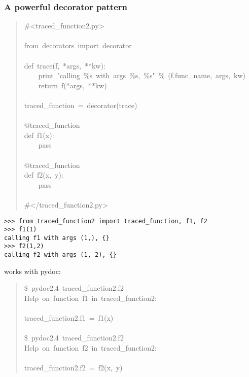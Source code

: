 \documentclass[10pt,a4paper,english]{article}
\begin{document}
\subsubsection*{A powerful decorator pattern}
\begin{quote}{\ttfamily \raggedright \noindent
{\#}<traced{\_}function2.py>~\\
~\\
from~decorators~import~decorator~\\
~\\
def~trace(f,~*args,~**kw):~\\
~~~~print~"calling~{\%}s~with~args~{\%}s,~{\%}s"~{\%}~(f.func{\_}name,~args,~kw)~~\\
~~~~return~f(*args,~**kw)~\\
~\\
traced{\_}function~=~decorator(trace)~\\
~\\
@traced{\_}function~\\
def~f1(x):~\\
~~~~pass~\\
~\\
@traced{\_}function~\\
def~f2(x,~y):~\\
~~~~pass~\\
~\\
{\#}</traced{\_}function2.py>
}\end{quote}
\begin{verbatim}>>> from traced_function2 import traced_function, f1, f2
>>> f1(1)
calling f1 with args (1,), {}
>>> f2(1,2)
calling f2 with args (1, 2), {}\end{verbatim}

works with pydoc:
\begin{quote}{\ttfamily \raggedright \noindent
{\$}~pydoc2.4~traced{\_}function2.f2~~~\\
Help~on~function~f1~in~traced{\_}function2:~\\
~\\
traced{\_}function2.f1~=~f1(x)~\\
~\\
{\$}~pydoc2.4~traced{\_}function2.f2~~~\\
Help~on~function~f2~in~traced{\_}function2:~\\
~\\
traced{\_}function2.f2~=~f2(x,~y)
}\end{quote}
\end{document}
